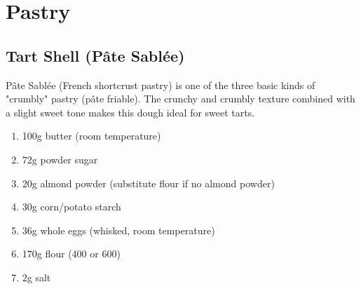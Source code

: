\chapter{Pastry}
\section{Tart Shell (Pâte Sablée)} \label{pate-sablee} \label{tart-shell}
Pâte Sablée (French shortcrust pastry) is one of the three basic kinds of
"crumbly" pastry (pâte friable). The crunchy and crumbly texture combined with
a slight sweet tone makes this dough ideal for sweet tarts.

\begin{enumerate}
  \item 100g butter (room temperature)
  \item 72g powder sugar
  \item 20g almond powder (substitute flour if no almond powder)
  \item 30g corn/potato starch
  \item 36g whole eggs (whisked, room temperature)
  \item 170g flour (400 or 600)
  \item 2g salt
\end{enumerate}

